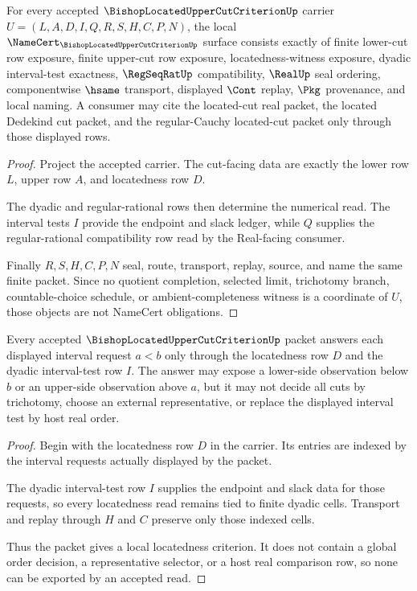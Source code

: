\begin{theorem}
\label{thm:bishop-located-upper-cut-criterion-obligations}
For every accepted $\BishopLocatedUpperCutCriterionUp$ carrier $U=(L,A,D,I,Q,R,S,H,C,P,N)$, the local $\NameCert_{\BishopLocatedUpperCutCriterionUp}$ surface consists exactly of finite lower-cut row exposure, finite upper-cut row exposure, locatedness-witness exposure, dyadic interval-test exactness, $\RegSeqRatUp$ compatibility, $\RealUp$ seal ordering, componentwise $\hsame$ transport, displayed $\Cont$ replay, $\Pkg$ provenance, and local naming. A consumer may cite the located-cut real packet, the located Dedekind cut packet, and the regular-Cauchy located-cut packet only through those displayed rows.
\end{theorem}
\begin{proof}
Project the accepted carrier. The cut-facing data are exactly the lower row $L$, upper row $A$, and locatedness row $D$.

The dyadic and regular-rational rows then determine the numerical read. The interval tests $I$ provide the endpoint and slack ledger, while $Q$ supplies the regular-rational compatibility row read by the Real-facing consumer.

Finally $R,S,H,C,P,N$ seal, route, transport, replay, source, and name the same finite packet. Since no quotient completion, selected limit, trichotomy branch, countable-choice schedule, or ambient-completeness witness is a coordinate of $U$, those objects are not NameCert obligations.
\end{proof}

\begin{theorem}
\label{thm:bishop-located-upper-cut-criterion-locatedness}
Every accepted $\BishopLocatedUpperCutCriterionUp$ packet answers each displayed interval request $a<b$ only through the locatedness row $D$ and the dyadic interval-test row $I$. The answer may expose a lower-side observation below $b$ or an upper-side observation above $a$, but it may not decide all cuts by trichotomy, choose an external representative, or replace the displayed interval test by host real order.
\end{theorem}
\begin{proof}
Begin with the locatedness row $D$ in the carrier. Its entries are indexed by the interval requests actually displayed by the packet.

The dyadic interval-test row $I$ supplies the endpoint and slack data for those requests, so every locatedness read remains tied to finite dyadic cells. Transport and replay through $H$ and $C$ preserve only those indexed cells.

Thus the packet gives a local locatedness criterion. It does not contain a global order decision, a representative selector, or a host real comparison row, so none can be exported by an accepted read.
\end{proof}

